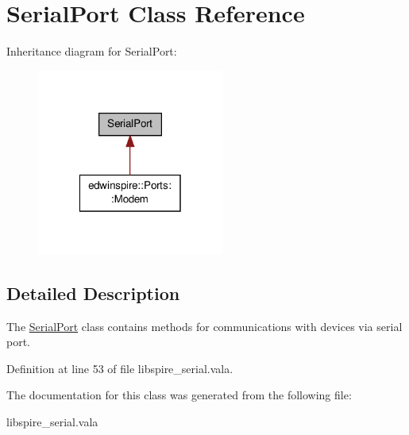\hypertarget{class_serial_port}{\section{Serial\-Port Class Reference}
\label{class_serial_port}
}


Inheritance diagram for Serial\-Port\-:\nopagebreak
\begin{figure}[H]
\begin{center}
\leavevmode
\includegraphics[width=174pt]{class_serial_port__inherit__graph}
\end{center}
\end{figure}


\subsection{Detailed Description}
The \hyperlink{class_serial_port}{Serial\-Port} class contains methods for communications with devices via serial port. 

Definition at line 53 of file libspire\-\_\-serial.\-vala.



The documentation for this class was generated from the following file\-:\begin{DoxyCompactItemize}
\item 
libspire\-\_\-serial.\-vala\end{DoxyCompactItemize}
